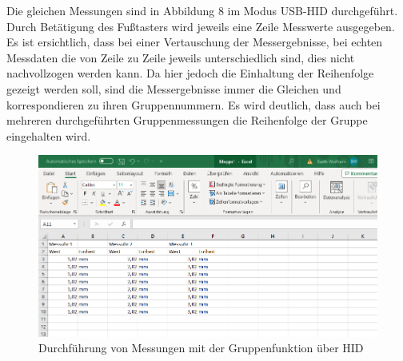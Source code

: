 Die gleichen Messungen sind in Abbildung 8 im Modus USB-HID durchgeführt. Durch Betätigung des Fußtasters wird jeweils eine Zeile Messwerte ausgegeben. Es ist ersichtlich, dass bei einer Vertauschung der Messergebnisse, bei echten Messdaten die von Zeile zu Zeile jeweils unterschiedlich sind, dies nicht nachvollzogen werden kann. Da hier jedoch die Einhaltung der Reihenfolge gezeigt werden soll, sind die Messergebnisse immer die Gleichen und korrespondieren zu ihren Gruppennummern. Es wird deutlich, dass auch bei mehreren durchgeführten Gruppenmessungen die Reihenfolge der Gruppe eingehalten wird.
\begin{figure}[H] 
	\centering
	\includegraphics[width=\textwidth]{figures/USBHIDGroup.png}
	\caption{Durchführung von Messungen mit der Gruppenfunktion über HID}
\end{figure}

